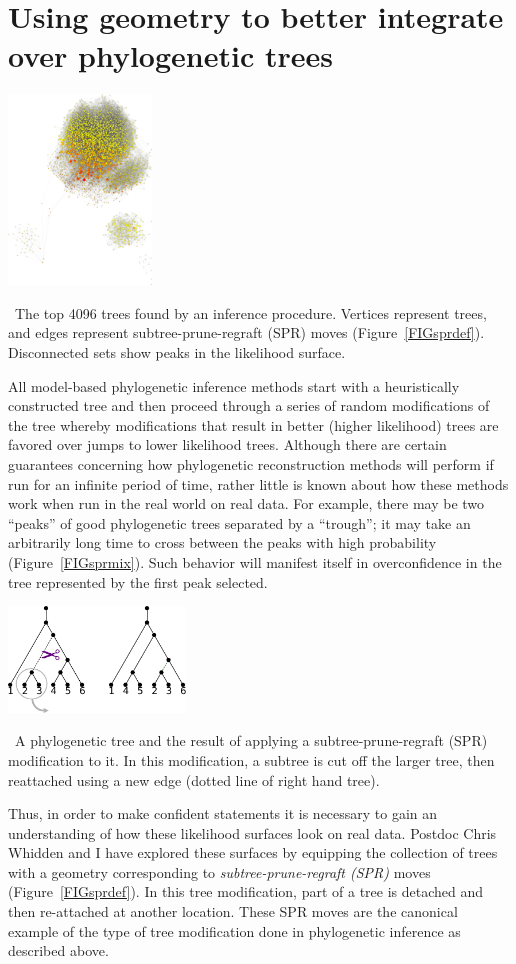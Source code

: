 \documentclass[hyper]{tufte-handout}
\begin{document}
\section{Using geometry to better integrate over phylogenetic trees}
\begin{marginfigure}%
  \includegraphics[width=1.5in]{ds6_small.png}
  \caption{\
    The top 4096 trees found by an inference procedure.
    Vertices represent trees, and edges represent subtree-prune-regraft (SPR) moves (Figure~\ref{FIGsprdef}).
    Disconnected sets show peaks in the likelihood surface.
    }
  \label{FIGsprmix}
\end{marginfigure}
All model-based phylogenetic inference methods start with a heuristically constructed tree and then proceed through a series of random modifications of the tree whereby modifications that result in better (higher likelihood) trees are favored over jumps to lower likelihood trees.
Although there are certain guarantees concerning how phylogenetic reconstruction methods will perform if run for an infinite period of time, rather little is known about how these methods work when run in the real world on real data.
For example, there may be two ``peaks'' of good phylogenetic trees separated by a ``trough''; it may take an arbitrarily long time to cross between the peaks with high probability (Figure~\ref{FIGsprmix}).
Such behavior will manifest itself in overconfidence in the tree represented by the first peak selected.

\begin{marginfigure}%
  \includegraphics[width=1.85in]{spr-definition.pdf}
  \caption{\
    A phylogenetic tree and the result of applying a subtree-prune-regraft (SPR) modification to it.
    In this modification, a subtree is cut off the larger tree, then reattached using a new edge (dotted line of right hand tree).
    }
  \label{FIGsprdef}
\end{marginfigure}
Thus, in order to make confident statements it is necessary to gain an understanding of how these likelihood surfaces look on real data.
Postdoc Chris Whidden and I have explored these surfaces by equipping the collection of trees with a geometry corresponding to \textit{subtree-prune-regraft (SPR)} moves (Figure~\ref{FIGsprdef}).
In this tree modification, part of a tree is detached and then re-attached at another location.
These SPR moves are the canonical example of the type of tree modification done in phylogenetic inference as described above.
\end{document}
